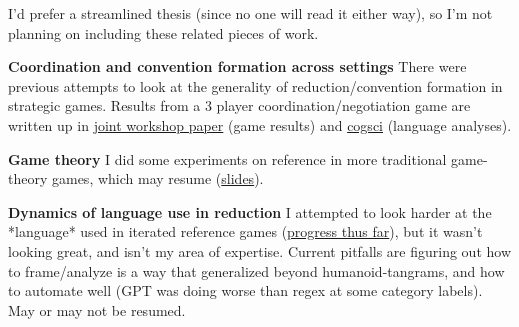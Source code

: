 \documentclass[]{article}
\begin{document}
I'd prefer a streamlined thesis (since no one will read it either way), so I'm not planning on including these related pieces of work.

\textbf{Coordination and convention formation across settings} There were previous attempts to look at the generality of reduction/convention formation in strategic games. Results from a 3 player coordination/negotiation game are written up in  \href{https://osf.io/preprints/psyarxiv/tfb3d}{joint workshop paper} (game results) and \href{https://escholarship.org/uc/item/8dq8c2s6}{cogsci} (language analyses). 

\textbf{Game theory} I did some experiments on reference in more traditional game-theory games, which may resume (\href{https://docs.google.com/presentation/d/1CzJ6fl6PEJ6NepUwjKKINLlVa80AAEMAQj4s5idrwIA/edit#slide=id.p}{slides}). 

\textbf{Dynamics of language use in reduction}  I attempted to look harder at the *language* used in iterated reference games (\href{https://rpubs.com/vboyce/tggpt1}{progress thus far}), but it wasn't looking great, and isn't my area of expertise.  Current pitfalls are figuring out how to frame/analyze is a way that generalized beyond humanoid-tangrams, and how to automate well (GPT was doing worse than regex at some category labels). May or may not be resumed. 
\end{document}
